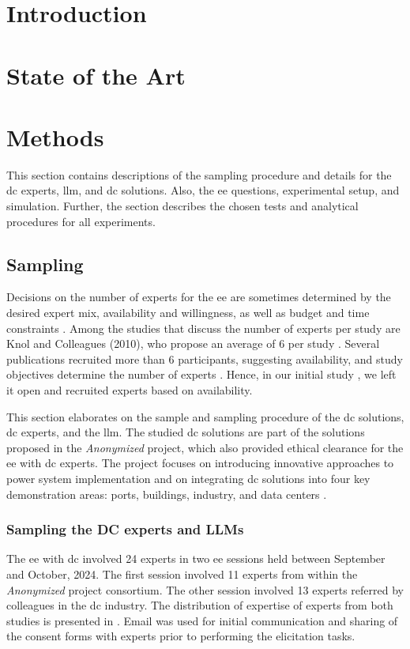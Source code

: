 \documentclass[manuscript,review,anonymous]{acmart}
\begin{document}
\section{Introduction}



\section{State of the Art}


\section{Methods}
This section contains descriptions of the sampling procedure and details for the \gls{dc} experts, \gls{llm}, and \gls{dc} solutions. Also, the \gls{ee} questions, experimental setup, and simulation. Further, the section describes the chosen tests and analytical procedures for all experiments.

\subsection{Sampling}
Decisions on the number of experts for the \gls{ee} are sometimes determined by the desired expert mix, availability and willingness, as well as budget and time constraints \cite{machadoCCS2021, ohaganEE2006}. Among the studies that discuss the number of experts per study are Knol and Colleagues (2010), who propose an average of 6 per study \cite{knolEE2010}. Several publications recruited more than 6 participants, suggesting availability, and study objectives determine the number of experts \cite{vossosAdoption2022, glasgoEE2018, whistonEE2022, machadoCCS2021}. Hence, in our initial study \cite{anonymized2025_ShiftingCurrents}, we left it open and recruited experts based on availability. 

This section elaborates on the sample and sampling procedure of the \gls{dc} solutions, \gls{dc} experts, and the \gls{llm}. The studied \gls{dc} solutions are part of the solutions proposed in the \textit{Anonymized} project, which also provided ethical clearance for the \gls{ee} with \gls{dc} experts. The project focuses on introducing innovative approaches to power system implementation and on integrating \gls{dc} solutions into four key demonstration areas: ports, buildings, industry, and data centers \cite{Anonymized}. 

\subsubsection{Sampling the DC experts and LLMs}
The \gls{ee} with \gls{dc} involved 24 experts in two \gls{ee} sessions held between September and October, 2024. The first session involved 11 experts from within the \textit{Anonymized} project consortium. The other session involved 13 experts referred by colleagues in the \gls{dc} industry. The distribution of expertise of experts from both studies is presented in . Email was used for initial communication and sharing of the consent forms with experts prior to performing the elicitation tasks. 
\end{document}
